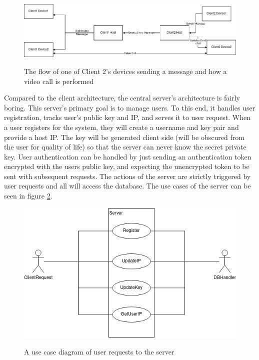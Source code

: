 \documentclass[titlepage]{article}
\begin{document}
      \begin{center}
          \begin{figure}[!ht]
              \includegraphics[scale=.5]{graphics/clientHost.png}
              \label{clientHost}
              \caption{The flow of one of Client 2's devices sending a message and how a video call is performed}
          \end{figure}
      \end{center}

      Compared to the client architecture, the central server's architecture is fairly boring.
      This server's primary goal is to manage users.
      To this end, it handles user registration, tracks user's public key and IP, and serves it to user request.
      When a user registers for the system, they will create a username and key pair and provide a host IP.
      The key will be generated client side (will be obscured from the user for quality of life) so that the server can never know the secret private key.
      User authentication can be handled by just sending an authentication token encrypted with the users public key, and expecting the unencrypted token to be sent with subsequent requests.
      The actions of the server are strictly triggered by user requests and all will access the database.
      The use cases of the server can be seen in figure \ref{serverUse}.

      \begin{center}
          \begin{figure}[!ht]
              \includegraphics[scale=.5]{graphics/ServerUseCase.png}
              \label{serverUse}
              \caption{A use case diagram of user requests to the server}
          \end{figure}
      \end{center}
\end{document}
